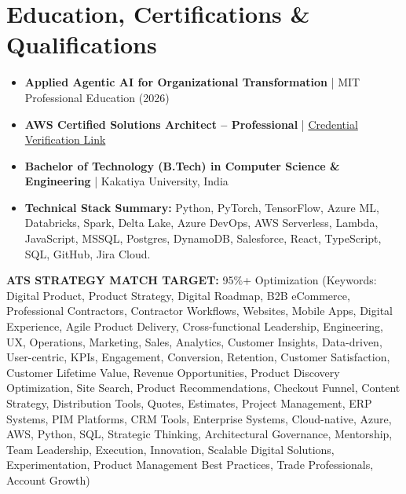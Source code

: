 \documentclass[9pt, letterpaper]{extarticle}
\begin{document}
\section{Education, Certifications \& Qualifications}
\begin{itemize}
    \item \textbf{Applied Agentic AI for Organizational Transformation} | MIT Professional Education (2026)
    \item \textbf{AWS Certified Solutions Architect -- Professional} | \href{https://www.credly.com/badges/7ef67d8d-67f2-4036-a8bf-8bbe73098a1f/linked_in?t=teze8g}{Credential Verification Link}
    \item \textbf{Bachelor of Technology (B.Tech) in Computer Science \& Engineering} | Kakatiya University, India
    \item \textbf{Technical Stack Summary:} Python, PyTorch, TensorFlow, Azure ML, Databricks, Spark, Delta Lake, Azure DevOps, AWS Serverless, Lambda, JavaScript, MSSQL, Postgres, DynamoDB, Salesforce, React, TypeScript, SQL, GitHub, Jira Cloud.
\end{itemize}

\footnotesize \textbf{ATS STRATEGY MATCH TARGET:} 95\%+ Optimization (Keywords: Digital Product, Product Strategy, Digital Roadmap, B2B eCommerce, Professional Contractors, Contractor Workflows, Websites, Mobile Apps, Digital Experience, Agile Product Delivery, Cross-functional Leadership, Engineering, UX, Operations, Marketing, Sales, Analytics, Customer Insights, Data-driven, User-centric, KPIs, Engagement, Conversion, Retention, Customer Satisfaction, Customer Lifetime Value, Revenue Opportunities, Product Discovery Optimization, Site Search, Product Recommendations, Checkout Funnel, Content Strategy, Distribution Tools, Quotes, Estimates, Project Management, ERP Systems, PIM Platforms, CRM Tools, Enterprise Systems, Cloud-native, Azure, AWS, Python, SQL, Strategic Thinking, Architectural Governance, Mentorship, Team Leadership, Execution, Innovation, Scalable Digital Solutions, Experimentation, Product Management Best Practices, Trade Professionals, Account Growth)
\end{document}
